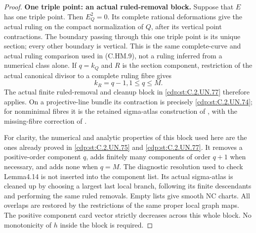 \begin{proof}
\par\medskip\noindent\textbf{One triple point: an actual ruled-removal block.}
Suppose that \(E\) has one triple point. Then \(E_Q^2=0\).
Its complete rational deformations give the actual ruling
on the compact normalization of \(Q\), after its vertical
point contractions. The boundary passing through this one
triple point is its unique section; every other boundary is
vertical. This is the same complete-curve and actual ruling
comparison used in (C.HM.9), not a ruling inferred from a
numerical class alone. If \(q=k_Q\) and \(R\) is the section
component, restriction of the actual canonical divisor to
a complete ruling fibre gives
\[
                         k_R=q-1,
                         1\le q\le M.
 \tag{C.AP.7}\label{cdp:eq:C.AP.7}
\]
The actual finite ruled-removal and cleanup block in \ref{cdp:st:C.2.UN.77}
therefore applies. On a projective-line bundle its contraction
is precisely \ref{cdp:st:C.2.UN.74}; for nonminimal fibres it is the retained
sigma-atlas construction of
\cite[\S\S4.10.7--4.10.9,4.14]{Kulikov1977}, with the
missing-fibre correction of \cite[\S8]{Kulikov1981}.

For clarity, the numerical and analytic properties of this
block used here are the ones already proved in \ref{cdp:st:C.2.UN.75} and
\ref{cdp:st:C.2.UN.77}. It removes a positive-order component \(q\), adds
finitely many components of order \(q+1\) when necessary,
and adds none when \(q=M\). The diagnostic resolution used
to check Lemma4.14 is not inserted into the component list.
Its actual sigma-atlas is cleaned up by choosing a largest
last local branch, following its finite descendants and
performing the same ruled removals. Empty lists give smooth
NC charts. All overlaps are restored by the restrictions of
the same proper local graph maps. The positive component
card vector strictly decreases across this whole block.
No monotonicity of \(h\) inside the block is required.


\end{proof}
